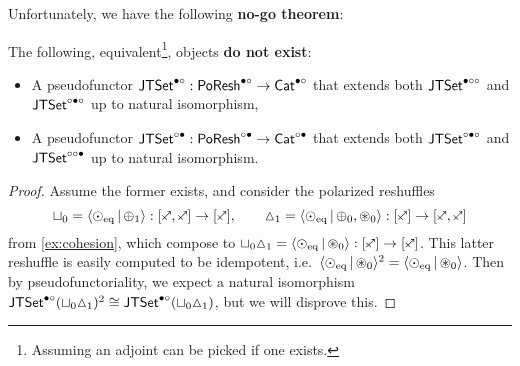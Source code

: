 \documentclass[a4paper]{memoir}
\begin{document}
Unfortunately, we have the following \textbf{no-go theorem}:
\begin{theorem} \label{thm:poresh-jtset:nogo}
	The following, equivalent\footnote{Assuming an adjoint can be picked if one exists.}, objects \textbf{do not exist}:
	\begin{itemize}
		\item A pseudofunctor $\mathsf{JTSet}^{\bullet \circ} : \mathsf{PoResh}^{\bullet \circ} \to {\mathsf{Cat}}^{\bullet \circ}$ that extends both $\mathsf{JTSet}^{\bullet \circ \circ}$ and $\mathsf{JTSet}^{\circ \bullet \circ}$ up to natural isomorphism,
		\item A pseudofunctor $\mathsf{JTSet}^{\circ \bullet} : \mathsf{PoResh}^{\circ \bullet} \to {\mathsf{Cat}}^{\circ \bullet}$ that extends both $\mathsf{JTSet}^{\circ \bullet \circ}$ and $\mathsf{JTSet}^{\circ \circ \bullet}$ up to natural isomorphism.
	\end{itemize}
\end{theorem}
\begin{proof}
	Assume the former exists, and consider the polarized reshuffles
	\[
		\cohfget_0 = \reshlist{\nonpol_\eqtydeg}{\pospol_1} : [\ypolar, \ypolar] \to [\ypolar], \qquad
		\cohdisc_1 = \reshlist{\nonpol_\eqtydeg}{\pospol_0, \isopol_0} : [\ypolar] \to [\ypolar, \ypolar]
	\]
	from \cref{ex:cohesion}, which compose to $\cohfget_0 \cohdisc_1 = \reshlist{\nonpol_\eqtydeg}{\isopol_0} : [\ypolar] \to [\ypolar]$.
	This latter reshuffle is easily computed to be idempotent, i.e.\ $\mathopen{}\left\langle {\odot}_{\mathrm{eq}} \,\middle|\, {\oast}_0 \right\rangle\mathclose{}^2 = \mathopen{}\left\langle {\odot}_{\mathrm{eq}} \,\middle|\, {\oast}_0 \right\rangle\mathclose{}$.
	Then by pseudofunctoriality, we expect a natural isomorphism $\mathsf{JTSet}^{\bullet \circ}({\sqcup}_0 {\vartriangle}_1)^2 \cong \mathsf{JTSet}^{\bullet \circ}({\sqcup}_0 {\vartriangle}_1)$, but we will disprove this.
	

\end{proof}
\end{document}
